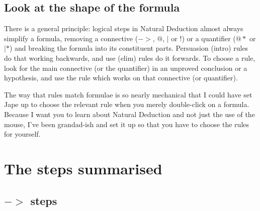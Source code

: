 \documentclass[11pt]{book}
\begin{document}
\section{Look at the shape of the formula}

There is a general principle: logical steps 
in Natural Deduction almost always simplify a formula, removing 
a connective ($->$, $@$, $|$ or $!$) or a quantifier ($@*$ 
or $|*$) and breaking the formula into its constituent parts. Persuasion 
(intro) rules do that working backwards, and use (elim) rules 
do it forwards. To choose a rule, look for the main connective 
(or the quantifier) in an unproved conclusion or a hypothesis, 
and use the rule which works on that connective (or quantifier).

The way that rules match formulae is so nearly mechanical 
that I could have set Jape up to choose the relevant rule 
when you merely double-click on a formula. Because I want you 
to learn about Natural Deduction and not just the use of the 
mouse, I've been grandad-ish and set it up so that you have to 
choose the rules for yourself.

\chapter{The steps summarised}

\section{$->$ steps}
\end{document}
